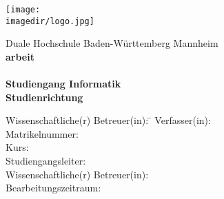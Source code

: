 \begin{titlepage}
\begin{minipage}{\textwidth}
		\vspace{-2cm}
		\noindent \hfill \texttt{[image: \\imagedir/logo.jpg]}
\end{minipage}
\vspace{1em}
\begin{center}
	{\textsf{\large Duale Hochschule Baden-W\"urttemberg Mannheim}}\\[4em]
	{\textsf{\textbf{\large{\DieArtDerArbeit}arbeit}}}\\[6mm]
	{\textsf{\textbf{\Large{}\DerTitelDerArbeit}}} \\[1.5cm]
	{\textsf{\textbf{\large{}Studiengang Informatik}}\\[6mm]
	\textsf{\textbf{Studienrichtung \DieStudienrichtung}}}\vspace{10em}

	\begin{minipage}{\textwidth}
		\begin{tabbing}
		Wissenschaftliche(r) Betreuer(in): \hspace{0.85cm}\=\kill
		Verfasser(in): \> \DerAutorDerArbeit \\[1.5mm]
		Matrikelnummer: \> \DieMatrikelnummer \\[1.5mm]
		Kurs: \> \DieKursbezeichnung \\[1.5mm]
		Studiengangsleiter: \> \DerStudiengangsleiter \\[1.5mm]
		Wissenschaftliche(r) Betreuer(in): \> \DerWissBetreuer \\[1.5mm]
		Bearbeitungszeitraum: \> \DerBearbeitungszeitraum\\[1.5mm]
		\end{tabbing}
	\end{minipage}
\end{center}
\end{titlepage}